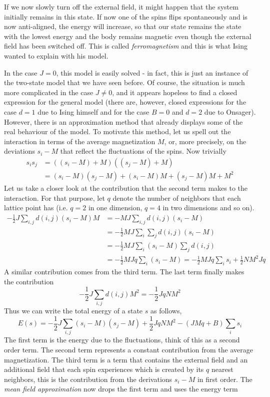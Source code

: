 \documentclass[a4paper, draft]{article}
\theoremstyle{own}
\theoremstyle{remark}
\begin{document}
If we now slowly turn off the external field, it might happen that the system initially remains in this state. If now one of the spins flips spontaneously and is now anti-aligned, the energy will increase, so that our state remains the state with the lowest energy and the body remains magnetic even though the external field has been switched off. This is called {\em ferromagnetism} and this is what Ising wanted to explain with his model. 

In the case $J = 0$, this model is easily solved - in fact, this is just an instance of the two-state model that we have seen before. Of course, the situation is much more complicated in the case $J \neq 0$, and it appears hopeless to find a closed expression for the general model (there are, however, closed expressions for the case $d=1$ due to Ising himself and for the case $B = 0$ and $d = 2$ due to Onsager). However, there is an approximation method that already displays some of the real behaviour of the model. To motivate this method, let us spell out the interaction in terms of the average magnetization $M$, or, more precisely, on the deviations $s_i - M$ that reflect the fluctuations of the spins. Now trivially
\begin{align*}
s_i s_j &= ((s_i - M) + M)((s_j - M)+ M) \\
&= (s_i - M)(s_j - M) + (s_i - M)M + (s_j - M) M + M^2
\end{align*}
Let us take a closer look at the contribution that the second term makes to the interaction. For that purpose, let $q$ denote the number of neighbors that each lattice point has (i.e. $q = 2$ in one dimension, $q = 4$ in two dimensions and so on).
\begin{align*}
- \frac{1}{2} J \sum_{i,j} d(i, j)(s_i - M) M &= - M J \sum_{i,j} d(i, j)(s_i - M) \\
&= -\frac{1}{2} MJ \sum_i \sum_j d(i, j) (s_i - M) \\
&= -\frac{1}{2} MJ \sum_i (s_i - M) \sum_j d(i, j) \\
&= - \frac{1}{2}MJ q \sum_i (s_i - M)  = - \frac{1}{2}MJ q \sum_i s_i + \frac{1}{2} N M^2 J q
\end{align*}
A similar contribution comes from the third term. The last term finally makes the contribution
$$
- \frac{1}{2} J \sum_{i, j} d(i, j) M^2 = - \frac{1}{2} J q N M^2 
$$
Thus we can write the total energy of a state $s$ as follows,
$$
E(s) = - \frac{1}{2} J \sum_{i, j} (s_i - M)(s_j - M) + \frac{1}{2} J q N M^2  - (J M q + B) \sum_i s_i
$$
The first term is the energy due to the fluctuations, think of this as a second order term. The second term represents a constant contribution from the average magnetization. The third term is a term that contains the external field and an additional field that each spin experiences which is created by its $q$ nearest neighbors, this is the contribution from the derivations $s_i - M$ in first order. The {\em mean field approximation} now drops the first term and uses the energy term
\end{document}
